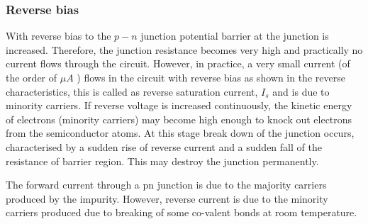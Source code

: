 \subsubsection{Reverse bias}
 With reverse bias to the $p - n$ junction potential barrier at the junction is increased. Therefore, the junction resistance becomes very high and practically no current flows through the circuit. However, in practice, a very small current (of the order of $\mu A$ ) flows in the circuit with reverse bias as shown in the reverse characteristics, this is called as reverse saturation current, $I_{s}$ and is due to minority carriers. 
 If reverse voltage is increased continuously, the kinetic energy of electrons (minority carriers) may become high enough to knock out electrons from the semiconductor atoms. At this stage break down of the junction occurs, characterised by a sudden rise of reverse current and a sudden fall of the resistance of barrier region. This may destroy the junction permanently.
\begin{center}
\end{center}
\begin{note}
	The forward current through a pn junction is due to the majority carriers produced by the impurity. However, reverse current is due to the minority carriers produced due to breaking of some co-valent bonds at room temperature.
\end{note}
